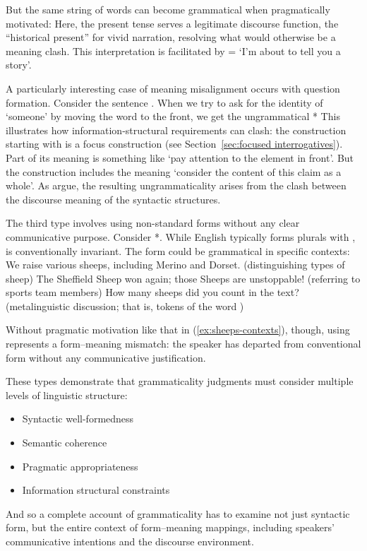 But the same string of words can become grammatical when pragmatically motivated:
\z
Here, the present tense serves a legitimate discourse function, the ``historical present'' for vivid narration, resolving what would otherwise be a meaning clash. This interpretation is facilitated by  = `I'm about to tell you a story'.

A particularly interesting case of meaning misalignment occurs with question formation. Consider the sentence . When we try to ask for the identity of `someone' by moving the word to the front, we get the ungrammatical * This illustrates how information-structural requirements can clash: the construction starting with  is a focus construction (see Section~\ref{sec:focused interrogatives}). Part of its meaning is something  like `pay attention to the element in front'. But the  construction includes the meaning `consider the content of this claim as a whole'. As \citet{cuneo_goldberg_2022} argue, the resulting ungrammaticality arises from the clash between the discourse meaning of the syntactic structures.

The third type involves using non-standard forms without any clear communicative purpose. Consider *. While English typically forms plurals with ,  is conventionally invariant. The form  could be grammatical in specific contexts:
\ea\label{ex:sheeps-contexts}
    \ea We raise various sheeps, including Merino and Dorset. (distinguishing types of sheep)
    \ex The Sheffield Sheep won again; those Sheeps are unstoppable! (referring to sports team members)
    \ex How many sheeps did you count in the text? (metalinguistic discussion; that is, tokens of the word )
    \z
\z

Without pragmatic motivation like that in (\ref{ex:sheeps-contexts}), though, using  represents a form--meaning mismatch: the speaker has departed from conventional form without any communicative justification.

These types demonstrate that grammaticality judgments must consider multiple levels of linguistic structure:
\begin{itemize}[noitemsep]
    \item Syntactic well-formedness
    \item Semantic coherence
    \item Pragmatic appropriateness
    \item Information structural constraints
\end{itemize}
And so a complete account of grammaticality has to examine not just syntactic form, but the entire context of form--meaning mappings, including speakers' communicative intentions and the discourse environment.

